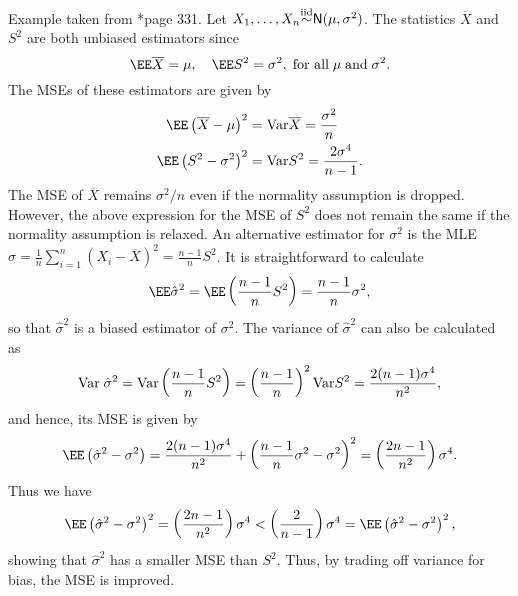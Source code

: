 \begin{exam} \label{exam: norm_mse_p1}
    Example taken from \cite{CasellaGeorge2001SI}*{page 331}. Let $X_1 , \ldots , X_n {\overset{\text{iid}}{\sim}} {\sf N} (\mu , \sigma^2)$. The statistics $\overline{X}$ and $S^2$ are both unbiased estimators since
    \begin{equation*}
        \EE \overline{X} = \mu, \quad \EE S^2 = \sigma^2, \; \text{for all} \; \mu \; \text{and} \; \sigma^2.
    \end{equation*}
    The MSEs of these estimators are given by
    \begin{align*}
        \EE \left( \overline{X} - \mu \right)^2 & = \Var \overline{X} = \frac{\sigma^2}{n} \\
        \EE \left( S^2 - \sigma^2 \right)^2     & = \Var S^2 = \frac{2 \sigma^4}{n - 1}.
    \end{align*}
    The MSE of $\overline{X}$ remains $\sigma^2 / n$ even if the normality assumption is dropped. However, the above expression for the MSE of $S^2$ does not remain the same if the normality assumption is relaxed. An alternative estimator for $\sigma^2$ is the MLE $\hat{\sigma} = \frac{1}{n} \sum_{i=1}^{n} \left( X_i - \overline{X} \right)^2 = \frac{n-1}{n} S^2$. It is straightforward to calculate
    \begin{equation*}
        \EE \hat{\sigma}^2 = \EE \left( \frac{n-1}{n} S^2 \right) = \frac{n-1}{n} \sigma^2,
    \end{equation*}
    so that $\hat{\sigma}^2$ is a biased estimator of $\sigma^2$. The variance of $\hat{\sigma}^2$ can also be calculated as
    \begin{equation*}
        {\operatorname{Var}} \; \hat{\sigma}^2 = {\operatorname{Var}} \left( \frac{n-1}{n} S^2 \right) = \left( \frac{n-1}{n} \right)^2 {\operatorname{Var}} S^2 = \frac{2(n-1) \sigma^4}{n^2},
    \end{equation*}
    and hence, its MSE is given by
    \begin{equation*}
        \EE \left( \hat{\sigma}^2 - \sigma^2 \right) = \frac{2(n-1)\sigma^4}{n^2} + \left( \frac{n-1}{n} \sigma^2 - \sigma^2 \right)^2 = \left( \frac{2n-1}{n^2} \right) \sigma^4.
    \end{equation*}
    Thus we have
    \begin{equation*}
        \EE \left( \hat{\sigma}^2 - \sigma^2 \right)^2 = \left( \frac{2n-1}{n^2} \right) \sigma^4  < \left( \frac{2}{n-1} \right) \sigma^4 = \EE \left( \hat{\sigma}^2 - \sigma^2 \right)^2,
    \end{equation*}
    showing that $\hat{\sigma}^2$ has a smaller MSE than $S^2$. Thus, by trading off variance for bias, the MSE is improved.
\end{exam}

